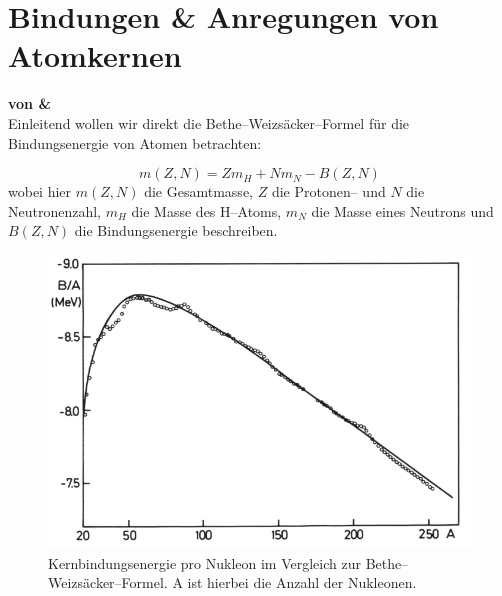 \documentclass[Ex4_Zusammenfassung.tex]{subfiles}
\begin{document}
\chapter{Bindungen \& Anregungen von Atomkernen}
\textbf{von \martina \& \soeren}\\

Einleitend wollen wir direkt die Bethe--Weizsäcker--Formel für die Bindungsenergie von Atomen betrachten:

\begin{equation}
	m(Z,N) = Z m_H + N m_N - B(Z,N)
\end{equation}
wobei hier $m(Z,N)$ die Gesamtmasse, $Z$ die Protonen-- und $N$ die Neutronenzahl, $m_H$ die Masse des H--Atoms, $m_N$ die Masse eines Neutrons und $B(Z,N)$ die Bindungsenergie beschreiben.

\begin{figure}[h]
	\centering
	\includegraphics[scale=0.5]{bethe-weizsaecker.png}
	\caption{Kernbindungsenergie pro Nukleon im Vergleich zur Bethe--Weizsäcker--Formel. A ist hierbei die Anzahl der Nukleonen.}
	\label{kernbindungsenergie}
\end{figure}
\end{document}
